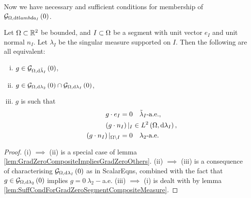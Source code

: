 \documentclass[11pt]{report}
\newcommand{\tlambda}{\tilde{\lambda}}
\begin{document}
Now we have necessary and sufficient conditions for membership of $\mathcal{G}_{ \Omega, \mathrm{d}tlambda_I}\left( 0 \right)$.
\begin{prop} \label{prop:CharGradZeroSegmentCompositeMeasure}
	Let $\Omega\subset\mathbb{R}^2$ be bounded, and $I\subset\Omega$ be a segment with unit vector $e_I$ and unit normal $n_I$.
	Let $\lambda_I$ be the singular measure supported on $I$.
	Then the following are all equivalent:
	\begin{enumerate}[(i)]
		\item $g\in\gradZero{\ddom}{\tlambda_I}$,
		\item $g\in\mathcal{G}_{ \Omega, \mathrm{d}\lambda_2}\left( 0 \right) \cap \mathcal{G}_{ \Omega, \mathrm{d}\lambda_I}\left( 0 \right)$,
		\item $g$ is such that
		\begin{align*}
			g\cdot e_I =0 &\quad\tlambda_I\text{-a.e.}, \\
			\bracs{g\cdot n_I}\vert_I &\in\ltwo{\ddom}{\lambda_I}, \\
			\bracs{g\cdot n_I}\vert_{\ddom\setminus I} =0 &\quad\lambda_2\text{-a.e.}
		\end{align*}
	\end{enumerate}
\end{prop}
\begin{proof}
	(i) $\implies$ (ii) is a special case of lemma \ref{lem:GradZeroCompositeImpliesGradZeroOthers}. \newline
	(ii) $\implies$ (iii) is a consequence of characterising $\mathcal{G}_{ \Omega, \mathrm{d}\lambda_I}\left( 0 \right)$ as in ScalarEqns, combined with the fact that $g\in\mathcal{G}_{ \Omega, \mathrm{d}\lambda_2}\left( 0 \right)$ implies $g=0 \ \lambda_2-$a.e. \newline
	(iii) $\implies$ (i) is dealt with by lemma \ref{lem:SuffCondForGradZeroSegmentCompositeMeasure}.
\end{proof}
\end{document}
